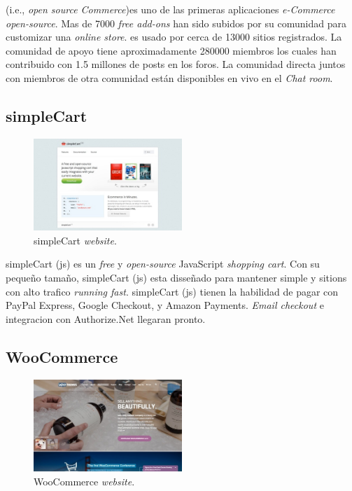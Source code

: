 \nameOsCommerce (i.e., \textit{open source Commerce})es uno de las primeras aplicaciones \textit{e-Commerce} \textit{open-source}. Mas de 7000 \textit{free add-ons} han sido subidos por su comunidad para customizar una  \textit{online store}. \nameOsCommerce es usado por cerca de 13000 sitios registrados. La comunidad de apoyo tiene aproximadamente 280000 miembros los cuales han contribuido con 1.5 millones de posts en los foros. La comunidad directa juntos con miembros de otra comunidad están disponibles en vivo en el \textit{Chat room}.

\newcommand{\nameSimpleCart}{simpleCart }
\subsection{\nameSimpleCart}

\begin{figure}[h!]
	\centering
	\includegraphics[width=0.5\textwidth]{figuras/cap1/simpleCartWebsite.jpg}
	\caption{\nameSimpleCart \textit{website}\cite{online_simpleCart}.}
\end{figure}

\nameSimpleCart(js) es un \textit{free} y \textit{open-source} JavaScript \textit{shopping cart}. Con su pequeño tamaño, \nameSimpleCart(js) esta disseñado para mantener simple  y sitions con alto trafico \textit{running fast}. \nameSimpleCart(js) tienen la habilidad de pagar con PayPal Express, Google Checkout, y Amazon Payments. \textit{Email checkout} e integracion con  Authorize.Net llegaran pronto.

\newcommand{\nameWooCommerce}{WooCommerce }
\subsection{\nameWooCommerce}

\begin{figure}[h!]
	\centering
	\includegraphics[width=0.5\textwidth]{figuras/cap1/WooCommerceWebsite.jpg}
	\caption{\nameWooCommerce \textit{website}\cite{online_WooCommerce}.}
\end{figure}

